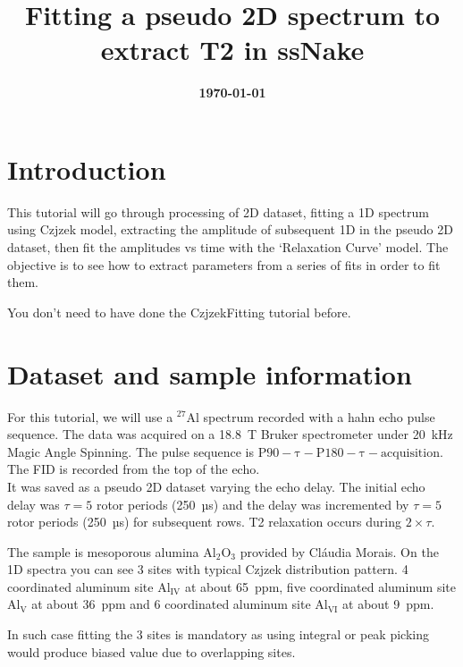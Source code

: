 \documentclass[11pt,a4paper]{article}
\title{\color{black}\fontfamily{SourceSansPro-LF}\bfseries Fitting a pseudo 2D spectrum to extract T2 in ssNake}
\author{}
\date{\color{black}\fontfamily{SourceSansPro-LF}\bfseries \today}
\begin{document}

\maketitle

\section{Introduction}
This tutorial will go through processing of 2D dataset, fitting a 1D spectrum using Czjzek model, extracting the amplitude of subsequent 1D
 in the pseudo 2D dataset, then fit the amplitudes vs time with the `Relaxation Curve' model. 
The objective is to see how to extract parameters from a series of fits in order to fit them.

You don't need to have done the CzjzekFitting tutorial before.

\section{Dataset and sample information}

For this tutorial, we will use a $\mathrm{{}^{27}Al}$ spectrum recorded with a hahn echo pulse sequence. 
The data was acquired on a 18.8~T Bruker spectrometer under 20~kHz Magic Angle Spinning.
The pulse sequence is $\mathrm{ P90 - \tau - P180 - \tau - acquisition}$.
The FID is recorded from the top of the echo. \\
It was saved as a pseudo 2D dataset varying the echo delay. The initial echo delay was $\tau=5$ rotor periods (250~µs)
and the delay was incremented by $\tau=5$ rotor periods (250~µs) for subsequent rows. T2 relaxation occurs during $2 \times \tau$.

The sample is mesoporous alumina $\mathrm{Al_2O_3}$ provided by Cláudia Morais. %
On the 1D spectra you can see 3 sites with typical Czjzek distribution pattern. 4 coordinated aluminum site $\mathrm{Al_{IV}}$ 
at about 65~ppm, five coordinated aluminum site $\mathrm{Al_{V}}$ at about 36~ppm and 6 coordinated aluminum site $\mathrm{Al_{VI}}$
at about 9~ppm.

In such case fitting the 3 sites is mandatory as using integral or peak picking would produce biased value due to overlapping sites.
\end{document}
